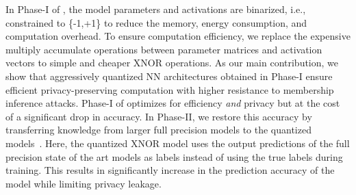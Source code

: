 
In Phase-I of \method, the model parameters and activations are binarized, i.e., constrained to \{-1,+1\} to reduce the memory, energy consumption, and computation overhead.
To ensure computation efficiency, we replace the expensive multiply accumulate operations between parameter matrices and activation vectors 
to simple and cheaper XNOR operations.
As our main contribution, we show that aggressively quantized NN architectures obtained in Phase-I ensure efficient privacy-preserving computation with higher resistance to membership inference attacks.%
Phase-I of \method\hspace{0.02in} optimizes for efficiency \textit{and} privacy but at the cost of a significant drop in accuracy.
In Phase-II, we restore this accuracy 
by transferring knowledge from larger full precision models to the quantized models~\cite{shejwalkar2019reconciling}.
Here, the quantized XNOR model uses the output predictions of the full precision state of the art models as labels instead of using the true labels during training.
This results in significantly increase in the prediction accuracy of the model while limiting privacy leakage. 


